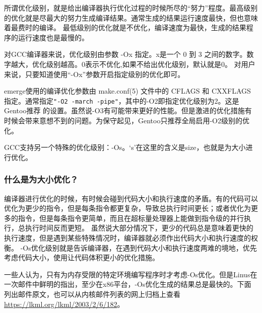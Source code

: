 \documentclass[amstex,twoside]{ctexbook}
\newenvironment{insertnote}{ \ttfamily\CJKfamily{KaiTi} }{\vskip 0.5cm }
\begin{document}
所谓优化级别，就是给出编译器执行优化过程的时候所尽的“努力”程度。最高级别的优化就是尽最大的努力生成编译结果。通常生成的结果运行速度最快，但也意味着最费时的编译。
最低级别的优化就是不优化，编译速度为最快，生成的结果程序的运行速度也是最慢的。

对GCC编译器来说，优化级别由参数 -Ox 指定。x是一个  0 到 3 之间的数字。数字越大，优化级别越高。0表示不优化,如果不给出优化级别，默认就是0。
对用户来说，只要知道使用“-Ox”参数开启指定级别的优化即可。

emerge{}使用的编译优化参数由 make.conf(5) 文件中的{ }CFLAGS{ }和{ }CXXFLAGS{ }指定。通常指定\texttt{"-O2 -march -pipe"}，其中的-O2即指定优化级别为2。这是Gentoo推荐
的设置。虽然说-O3有可能带来更好的性能。但是激进的优化措施有时候会带来意想不到的问题。为保守起见，Gentoo只推荐全局启用-O2级别的优化。

GCC支持另一个特殊的优化级别：-Os。‘s’在这里的含义是size，也就是为大小进行优化。

\begin{insertnote}
\subsubsection{什么是为大小优化？}

编译器进行优化的时候，有时候会碰到代码大小和执行速度的矛盾。有的代码可以优化为更少的指令，但是每条指令都更复杂，导致总执行时间更长；或者优化为更多的指令，但是每条指令更简单，而且在超标量处理器上能做到指令级的并行执行，总执行时间反而更短。
虽然说大部分情况下，更少的代码总是意味着更快的执行速度，但是遇到某些特殊情况时，编译器就必须作出代码大小和执行速度的权衡。
-Os{}优化级别就是告诉编译器，在遇到代码大小和执行速度两难的境地，优先考虑代码大小，使用让代码体积更小的优化措施。

\end{insertnote}

一些人认为，只有为内存受限的特定环境编写程序时才考虑-Os优化。但是Linus在一次邮件中鲜明的指出，至少在x86平台，-Os优化生成的结果总是最快的。下面列出邮件原文，也可以从内核邮件列表的网上归档上查看 \url{https://lkml.org/lkml/2003/2/6/182}。
\end{document}
